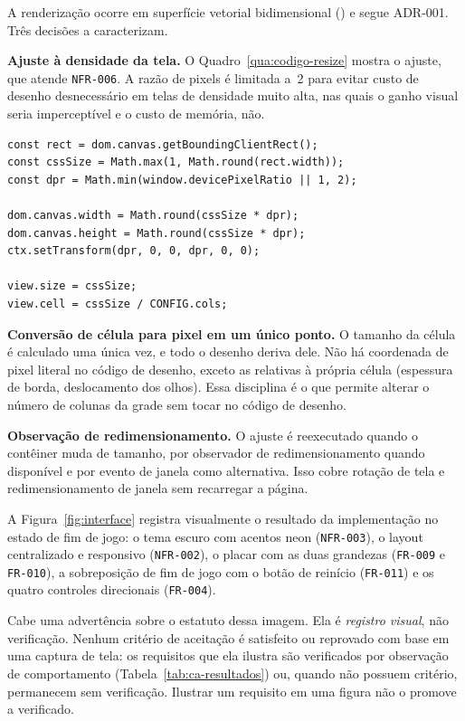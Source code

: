 A renderização ocorre em superfície vetorial bidimensional
() e segue ADR-001. Três decisões a caracterizam.

\textbf{Ajuste à densidade da tela.} O Quadro~\ref{qua:codigo-resize} mostra o
ajuste, que atende \texttt{NFR-006}. A razão de pixels é limitada a~2 para evitar
custo de desenho desnecessário em telas de densidade muito alta, nas quais o
ganho visual seria imperceptível e o custo de memória, não.

\begin{quadro}[htb]
	\caption{Trecho do ajuste da superfície de desenho à densidade da tela (excertado)}
	\label{qua:codigo-resize}
	\begin{lstlisting}[style=codigo]
const rect = dom.canvas.getBoundingClientRect();
const cssSize = Math.max(1, Math.round(rect.width));
const dpr = Math.min(window.devicePixelRatio || 1, 2);

dom.canvas.width = Math.round(cssSize * dpr);
dom.canvas.height = Math.round(cssSize * dpr);
ctx.setTransform(dpr, 0, 0, dpr, 0, 0);

view.size = cssSize;
view.cell = cssSize / CONFIG.cols;
	\end{lstlisting}
\end{quadro}

\textbf{Conversão de célula para pixel em um único ponto.} O tamanho da célula é
calculado uma única vez, e todo o desenho deriva dele. Não há coordenada de pixel
literal no código de desenho, exceto as relativas à própria célula (espessura de
borda, deslocamento dos olhos). Essa disciplina é o que permite alterar o número
de colunas da grade sem tocar no código de desenho.

\textbf{Observação de redimensionamento.} O ajuste é reexecutado quando o
contêiner muda de tamanho, por observador de redimensionamento quando disponível
e por evento de janela como alternativa. Isso cobre rotação de tela e
redimensionamento de janela sem recarregar a página.

A Figura~\ref{fig:interface} registra visualmente o resultado da implementação no
estado de fim de jogo: o tema escuro com acentos neon (\texttt{NFR-003}), o
layout centralizado e responsivo (\texttt{NFR-002}), o placar com as duas
grandezas (\texttt{FR-009} e \texttt{FR-010}), a sobreposição de fim de jogo com
o botão de reinício (\texttt{FR-011}) e os quatro controles direcionais
(\texttt{FR-004}).

Cabe uma advertência sobre o estatuto dessa imagem. Ela é \emph{registro visual},
não verificação. Nenhum critério de aceitação é satisfeito ou reprovado com base
em uma captura de tela: os requisitos que ela ilustra são verificados por
observação de comportamento (Tabela~\ref{tab:ca-resultados}) ou, quando não
possuem critério, permanecem sem verificação. Ilustrar um requisito em uma figura
não o promove a verificado.


